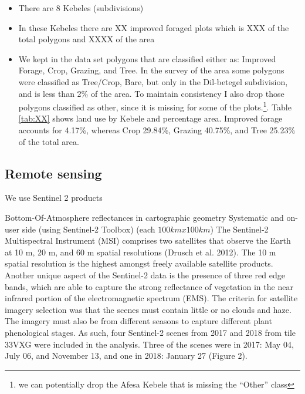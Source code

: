 \documentclass[10pt,a4paper,onecolumn]{article}
\begin{document}
\begin{itemize}
\item There are 8 Kebeles (subdivisions) 
\item In these Kebeles there are XX improved foraged plots which is XXX of the total polygons and XXXX of the area
\item We kept in the data set polygons that are classified either as: Improved Forage, Crop, Grazing, and Tree. In the survey of the area some polygons were classified as Tree/Crop, Bare, but only in the Dil-betegel subdivision, and is less than 2\% of the area. To maintain consistency I also drop those polygons classified as other, since it is missing for some of the plots.\footnote{we can potentially drop the Afesa Kebele that is missing the ``Other'' class}. Table \ref{tab:XX} shows land use by Kebele and percentage area. Improved forage  accounts for   4.17\%, whereas Crop 29.84\%,  Grazing 40.75\%, and Tree  25.23\% of the total area.
\end{itemize}







\subsection{Remote sensing}


We use Sentinel 2 products 

Bottom-Of-Atmosphere reflectances in cartographic geometry   Systematic and on-user side (using Sentinel-2 Toolbox)   (each $100km x 100km$)
The Sentinel-2 Multispectral Instrument (MSI) comprises two satellites that observe the Earth at 10 m, 20 m, and 60 m spatial resolutions (Drusch et al. 2012). The 10 m spatial resolution is the highest amongst freely available satellite products. Another unique aspect of the Sentinel-2 data is the presence of three red edge bands, which are able to capture the strong reflectance of vegetation in the near infrared portion of the electromagnetic spectrum (EMS).
The criteria for satellite imagery selection was that the scenes must contain little or no clouds and haze. The imagery must also be from different seasons to capture different plant phenological stages. As such, four Sentinel-2 scenes from 2017 and 2018 from tile 33VXG were included in the analysis. Three of the scenes were in 2017: May 04, July 06, and November 13, and one in 2018: January 27 (Figure 2). 



\end{document}
